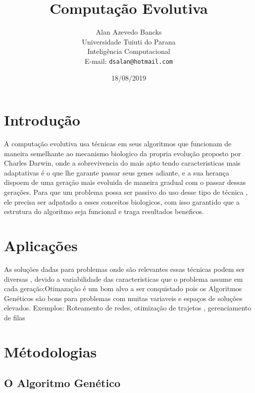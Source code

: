 \documentclass[a4paper,11pt]{article}
\title{Computação Evolutiva}
\author{Alan Azevedo Bancks \\ Universidade Tuiuti do Parana \\
Inteligência Computacional \\E-mail: {\tt dsalan@hotmail.com}}
\date{18/08/2019}
\begin{document}
\maketitle


\begin{multicols}{2}
\section{Introdução}

A computação evolutiva usa técnicas em seus algoritmos que funcionam de maneira semelhante ao mecanismo biologico 
da propria evolução proposto por Charles Darwin, onde a sobrevivencia do mais apto tendo caracteristicas
mais adaptativas é o que lhe garante passar seus genes adiante, e a sua herança dispoem de uma geração mais evoluida
de maneira gradual com o passar dessas gerações.
Para que um problema possa ser passivo do uso desse tipo de técnica , ele precisa ser adpatado a esses conceitos biologicos, 
com isso garantido que a estrutura do algoritmo seja funcional e traga resultados beneficos.\cite{artigo_motion} 





\section{Aplicações}

As soluções dadas para problemas onde são relevantes essas técnicas podem ser diversas , devido a variabilidade das caracteristicas
que o problema assume em cada geração;Otimazação é um bom alvo a ser conquistado pois os Algoritmos Genéticos são bons para problemas 
com muitas variaveis e espaços de soluções elevados. Exemplos: Roteamento de redes, otimização de trajetos , gerenciamento de filas 


\section{Métodologias}


\subsection{O Algoritmo Genético}



\end{multicols}
\end{document}
